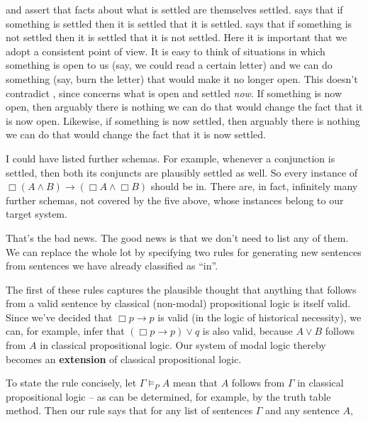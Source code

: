 
 and  assert that facts about what is settled are themselves
settled.  says that if something is settled then it is settled that it is
settled.  says that if something is not settled then it is settled that it
is not settled. Here it is important that we adopt a consistent point of view.
It is easy to think of situations in which something is open to us (say, we
could read a certain letter) and we can do something (say, burn the letter) that
would make it no longer open. This doesn't contradict , since 
concerns what is open and settled \emph{now}. If something is now open, then
arguably there is nothing we can do that would change the fact that it is now
open. Likewise, if something is now settled, then arguably there is nothing we
can do that would change the fact that it is now settled.

I could have listed further schemas. For example, whenever a conjunction is
settled, then both its conjuncts are plausibly settled as well. So every
instance of $\Box(A\land B) \to (\Box A \land \Box B)$ should be in. There are,
in fact, infinitely many further schemas, not covered by the five above, whose
instances belong to our target system.

That's the bad news. The good news is that we don't need to list any of them. We
can replace the whole lot by specifying two rules for generating new sentences
from sentences we have already classified as ``in''.

The first of these rules captures the plausible thought that anything that
follows from a valid sentence by classical (non-modal) propositional logic is
itself valid. Since we've decided that $\Box p \to p$ is valid (in the logic of
historical necessity), we can, for example, infer that $(\Box p \to p) \lor q$
is also valid, because $A \lor B$ follows from $A$ in classical propositional
logic.
Our system of modal
logic thereby becomes an \textbf{extension} of classical propositional
logic. \label{claim:extension}

To state the rule concisely, let $\Gamma \models_{P} A$ mean that $A$ follows
from $\Gamma$ in classical propositional logic -- as can be determined, for
example, by the truth table method. Then our rule says that for any list of
sentences $\Gamma$ and any sentence $A$,
%
\begin{principles}
\end{principles}

